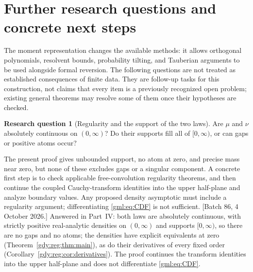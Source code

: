 \documentclass[11pt]{article}
\numberwithin{equation}{section}
\theoremstyle{definition}
\newtheorem{question}[theorem]{Research question}
\theoremstyle{remark}
\begin{document}
\section{Further research questions and concrete next steps}\label{gml:sec:research}
The moment representation changes the available methods: it allows
orthogonal polynomials, resolvent bounds, probability tilting, and
Tauberian arguments to be used alongside formal reversion. The following
questions are not treated as established consequences of finite data.
They are follow-up tasks for this construction, not claims that every item
is a previously recognized open problem; existing general theorems may
resolve some of them once their hypotheses are checked.

\begin{question}[Regularity and the support of the two laws]
Are $\mu$ and $\nu$ absolutely continuous on $(0,\infty)$? Do their supports
fill all of $[0,\infty)$, or can gaps or positive atoms occur?
\end{question}
The present proof gives unbounded support, no atom at zero, and precise
mass near zero, but none of these excludes gaps or a singular component.
A concrete first step is to check applicable free-convolution regularity
theorems, and then continue the coupled Cauchy-transform identities
into the upper half-plane and analyze boundary values. Any proposed
density asymptotic must include a regularity argument; differentiating
\eqref{gml:eq:CDF} is not sufficient.
[Batch 86, 4 October 2026.] Answered in Part~IV: both laws are absolutely continuous,
with strictly positive real-analytic densities on $(0,\infty)$ and
supports $[0,\infty)$, so there are no gaps and no atoms; the densities
have explicit equivalents at zero (Theorem~\ref{gdy:reg:thm:main}), as do
their derivatives of every fixed order
(Corollary~\ref{gdy:reg:cor:derivatives}). The proof continues the
transform identities into the upper half-plane and does not differentiate
\eqref{gml:eq:CDF}.
\end{document}
